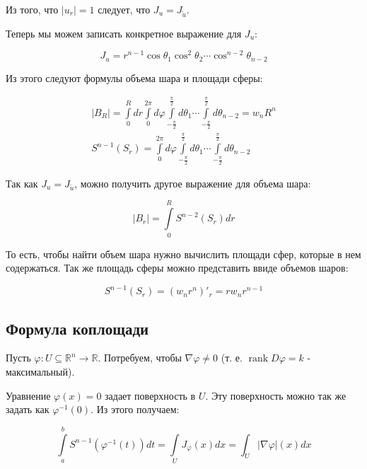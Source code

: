 \documentclass[a5paper]{article}
\theoremstyle{plain}
\theoremstyle{definition}
\numberwithin{through}{section}
\numberwithin{equation}{section}
\DeclareMathOperator{\rank}{rank}
\begin{document}
Из того, что $|u_r|=1$ следует, что $J_u = J_{\tilde{u}}$.

Теперь мы можем записать конкретное выражение для $J_u$:

\begin{equation*}
	J_u = r^{n-1} \cos \theta_1 \cos^2 \theta_2 \cdots \cos^{n-2} \theta_{n-2}
\end{equation*}

Из этого следуют формулы объема шара и площади сферы:

\begin{align*}
	|B_R| = \int\limits_0^R dr \int\limits_{0}^{2\pi} d \varphi \int\limits_{-\frac{\pi}{2}}^{\frac{\pi}{2}} d \theta_1 \cdots \int\limits_{-\frac{\pi}{2}}^{\frac{\pi}{2}} d \theta_{n-2} = w_n R^n \\
	S^{n-1}(S_r) = \int\limits_{0}^{2\pi} d \varphi \int\limits_{-\frac{\pi}{2}}^{\frac{\pi}{2}} d \theta_1 \cdots \int\limits_{-\frac{\pi}{2}}^{\frac{\pi}{2}} d \theta_{n-2}
\end{align*}

Так как $J_u = J_{\tilde{u}}$, можно получить другое выражение для объема шара:

\begin{equation*}
	|B_r|=\int\limits_{0}^{R} S^{n-2}(S_r) dr
\end{equation*}

То есть, чтобы найти объем шара нужно вычислить площади сфер, которые в нем содержаться. Так же площадь сферы можно представить ввиде объемов шаров:

\begin{equation*}
	S^{n-1}(S_r) = (w_n r^n)'_r=r w_n r^{n-1}
\end{equation*}

\subsection{Формула коплощади} 

Пусть $\varphi : U \subseteq \mathbb{R}^n \to \mathbb{R}$. Потребуем, чтобы $\nabla \varphi \not= 0$ (т. е. $\rank D \varphi = k$ - максимальный). 

Уравнение $\varphi(x) = 0$ задает поверхность в $U$. Эту поверхность можно так же задать как $\varphi^{-1}(0)$. Из этого получаем:

\begin{equation*}
	\int\limits_{a}^{b} S^{n-1}(\varphi^{-1}(t)) dt = \int\limits_{U}^{} J_{\varphi} (x) dx = \int_U |\nabla \varphi| (x) dx
\end{equation*}
\end{document}
